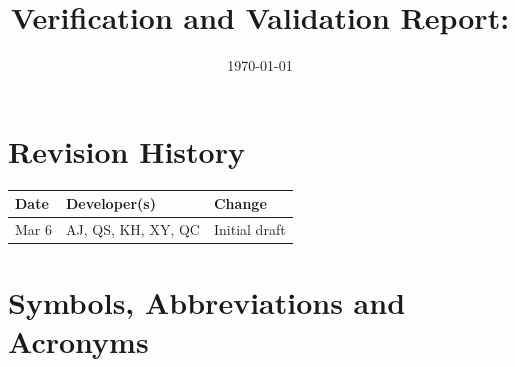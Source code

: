 \documentclass[12pt, titlepage]{article}
\begin{document}
\title{Verification and Validation Report: \progname} 
\author{\authname}
\date{\today}

\maketitle


\section{Revision History}

\begin{tabularx}{\textwidth}{llX}
  \toprule {\bf Date} & {\bf Developer(s)} & {\bf Change} \\
  \midrule
Mar 6 & AJ, QS, KH, XY, QC & Initial draft \\
  \bottomrule
\end{tabularx}

\newpage

\section{Symbols, Abbreviations and Acronyms}
\end{document}
